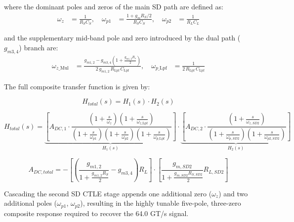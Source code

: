 \noindent where the dominant poles and zeros of the main SD path are defined as:
\begin{equation}
\begin{aligned}
    \omega_z       &= \frac{1}{R_S C_S},   \quad
    \omega_{p1}    &= \frac{1+g_m R_S/2}{R_S C_S}, \quad
    \omega_{p2}    &= \frac{1}{R_L C_L}
\end{aligned}
\label{eq:poles_sd}
\end{equation}

\noindent and the supplementary mid-band pole and zero introduced by the dual path ($g_{m3,4}$) branch are:
\begin{equation}
\begin{aligned}
    \omega_{z\_\mathrm{Mul}} &= \frac{g_{m1,2}-g_{m3,4}\!\left(1+\frac{g_{m1,2}R_s}{2}\right)}
                                    {2\,g_{m1,2}\,R_{\mathrm{Lpf}}\,C_{\mathrm{Lpf}}},
    \quad
    \omega_{p\_\mathrm{Lpf}} &= \frac{1}{2\,R_{\mathrm{Lpf}}\,C_{\mathrm{Lpf}}}
\end{aligned}
\label{eq:poles_mul}
\end{equation}

\noindent The full composite transfer function is given by:

\begin{equation*}
    H_{total}(s) = H_1(s) \cdot H_2(s)
\end{equation*}

\begin{equation*}
    H_{total}(s) = \underbrace{\left[ A_{DC,1} \cdot \frac{(1+\frac{s}{\omega_z})(1+\frac{s}{\omega_{z\_\mathrm{Lpf}}})}{(1+\frac{s}{\omega_{p1}})(1+\frac{s}{\omega_{p2}})(1+\frac{s}{\omega_{p\_\mathrm{Lpf}}})} \right]}_{H_1(s)} \cdot \underbrace{\left[ A_{DC,2} \cdot \frac{(1+\frac{s}{\omega_{z,SD2}})}{(1+\frac{s}{\omega_{p,SD2}})(1+\frac{s}{\omega_{p2,SD2}})} \right]}_{H_2(s)}
\end{equation*}

\begin{equation*}
    A_{DC,total} = -\left[ \left(\frac{g_{m1,2}}{1+\frac{g_{m1,2}R_S}{2}} - g_{m3,4}\right)R_L \right] \cdot \left[ \frac{g_{m,SD2}}{1+\frac{g_{m,SD2}R_{S,SD2}}{2}} R_{L,SD2} \right]
\end{equation*} 
\newline

\noindent Cascading the second SD CTLE stage appends one additional zero ($\omega_z$) and two additional poles ($\omega_{p1}$, $\omega_{p2}$), resulting in the highly tunable five-pole, three-zero composite response required to recover the 64.0 GT/s signal.















